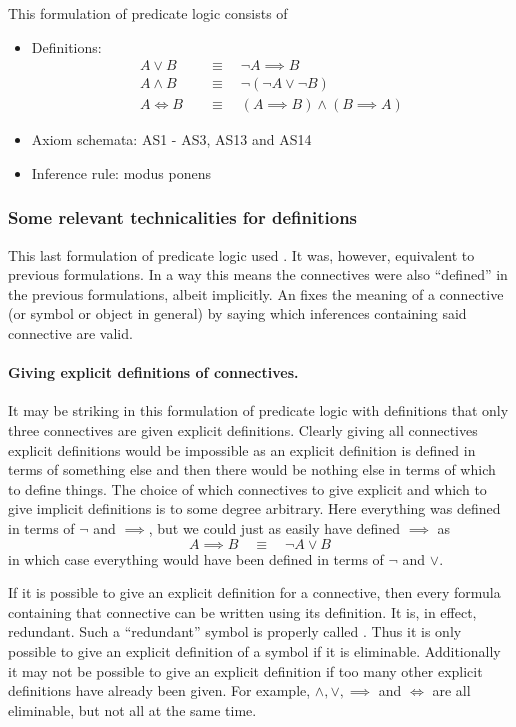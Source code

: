 This formulation of predicate logic consists of
\begin{itemize}
\item Definitions:
\begin{align*}
A \lor B &\quad\equiv\quad \neg A \implies B \\
A \land B &\quad\equiv\quad \neg(\neg A\lor \neg B) \\
A \iff B &\quad\equiv\quad (A\implies B)\land(B\implies A)
\end{align*}
\item Axiom schemata: AS1 - AS3, AS13 and AS14
\item Inference rule: modus ponens
\end{itemize}

\subsubsection{Some relevant technicalities for definitions}
This last formulation of predicate logic used . It was, however, equivalent to previous formulations. In a way this means the connectives were also ``defined'' in the previous formulations, albeit implicitly. An  fixes the meaning of a connective (or symbol or object in general) by saying which inferences containing said connective are valid.

\paragraph{Giving explicit definitions of connectives.}
It may be striking in this formulation of predicate logic with definitions that only three connectives are given explicit definitions. Clearly giving all connectives explicit definitions would be impossible as an explicit definition is defined in terms of something else and then there would be nothing else in terms of which to define things. The choice of which connectives to give explicit and which to give implicit definitions is to some degree arbitrary. Here everything was defined in terms of $\neg$ and $\implies$, but we could just as easily have defined $\implies$ as
\[ A \implies B \quad\equiv\quad \neg A \lor B \]
in which case everything would have been defined in terms of $\neg$ and $\lor$.

If it is possible to give an explicit definition for a connective, then every formula containing that connective can be written using its definition. It is, in effect, redundant. Such a ``redundant'' symbol is properly called . Thus it is only possible to give an explicit definition of a symbol if it is eliminable. Additionally it may not be possible to give an explicit definition if too many other explicit definitions have already been given. For example, $\land, \lor, \implies$ and $\iff$ are all eliminable, but not all at the same time.

